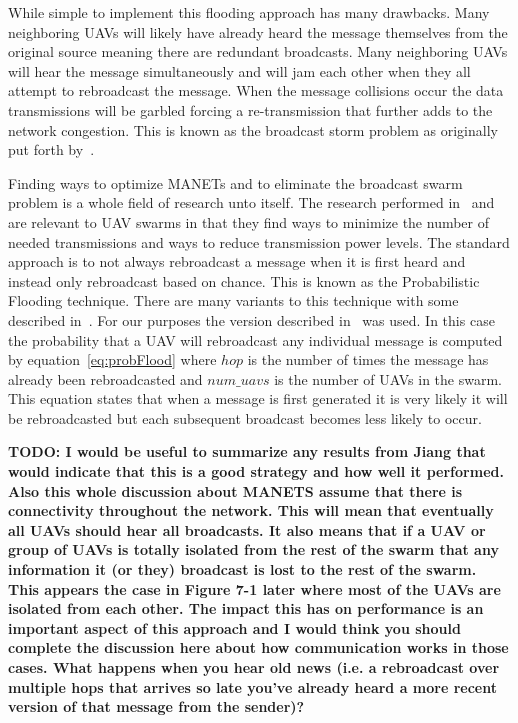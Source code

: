 While simple to implement this flooding approach has many drawbacks.  Many neighboring UAVs will likely have already heard the message themselves from the original source meaning there are redundant broadcasts.  Many neighboring UAVs will hear the message simultaneously and will jam each other when they all attempt to rebroadcast the message.  When the message collisions occur the data transmissions will be garbled forcing a re-transmission that further adds to the network congestion.  This is known as the broadcast storm problem as originally put forth by~\cite{bstorm}.

Finding ways to optimize MANETs and to eliminate the broadcast swarm problem is a whole field of research unto itself.  The research performed in~\cite{epidemicManets} and ~\cite{analysisOptNodeDen} are relevant to UAV swarms in that they find ways to minimize the number of needed transmissions and ways to reduce transmission power levels.  The standard approach is to not always rebroadcast a message when it is first heard and instead only rebroadcast based on chance.  This is known as the Probabilistic Flooding technique.  There are many variants to this technique with some described in~\cite{probFloodVariants}.  For our purposes the version described in~\cite{simpleProbFlood} was used.  In this case the probability that a UAV will rebroadcast any individual message is computed by equation~\ref{eq:probFlood} where $hop$ is the number of times the message has already been rebroadcasted and $num\_uavs$ is the number of UAVs in the swarm.  This equation states that when a message is first generated it is very likely it will be rebroadcasted but each subsequent broadcast becomes less likely to occur.

\textbf{TODO: I would be useful to summarize any results from Jiang that would indicate that this is a good strategy and how well it performed. Also this whole discussion about MANETS assume that there is connectivity throughout the network. This will mean that eventually all UAVs should hear all broadcasts. It also means that if a UAV or group of UAVs is totally isolated from the rest of the swarm that any information it (or they) broadcast is lost to the rest of the swarm. This appears the case in Figure 7-1 later where most of the UAVs are isolated from each other. The impact this has on performance is an important aspect of this approach and I would think you should complete the discussion here about how communication works in those cases.	What happens when you hear old news (i.e. a rebroadcast over multiple hops that arrives so late you’ve already heard a more recent version of that message from the sender)?}

